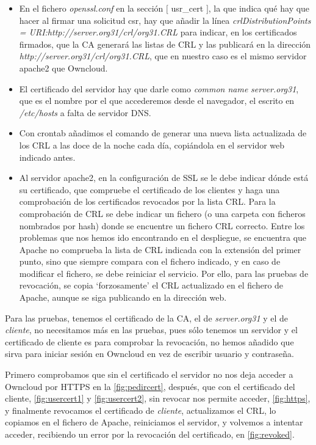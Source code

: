 \documentclass[]{article}
\begin{document}
\begin{itemize}
	\item En el fichero \textit{openssl.conf} en la sección $[$ usr\_cert $]$, la que indica qué hay que hacer al firmar una solicitud csr, hay que añadir la línea \textit{crlDistributionPoints = URI:http://server.org31/crl/org31.CRL} para indicar, en los certificados firmados, que la CA generará las listas de CRL y las publicará en la dirección \textit{http://server.org31/crl/org31.CRL}, que en nuestro caso es el mismo servidor apache2 que Owncloud.
	\item El certificado del servidor hay que darle como \textit{common name} \textit{server.org31}, que es el nombre por el que accederemos desde el navegador, el escrito en \textit{/etc/hosts} a falta de servidor DNS.
	\item Con crontab añadimos el comando de generar una nueva lista actualizada de los CRL a las doce de la noche cada día, copiándola en el servidor web indicado antes.
	\item Al servidor apache2, en la configuración de SSL se le debe indicar dónde está su certificado, que compruebe el certificado de los clientes y haga una comprobación de los certificados revocados por la lista CRL.
	\subitem Para la comprobación de CRL se debe indicar un fichero (o una carpeta con ficheros nombrados por hash) donde se encuentre un fichero CRL correcto.
	\subitem Entre los problemas que nos hemos ido encontrando en el despliegue, se encuentra que Apache no comprueba la lista de CRL indicada con la extensión del primer punto, sino que siempre compara con el fichero indicado, y en caso de modificar el fichero, se debe reiniciar el servicio. Por ello, para las pruebas de revocación, se copia `forzosamente' el CRL actualizado en el fichero de Apache, aunque se siga publicando en la dirección web.
\end{itemize}

\hfill

Para las pruebas, tenemos el certificado de la CA, el de \textit{server.org31} y el de \textit{cliente}, no necesitamos más en las pruebas, pues sólo tenemos un servidor y el certificado de cliente es para comprobar la revocación, no hemos añadido que sirva para iniciar sesión en Owncloud en vez de escribir usuario y contraseña.

Primero comprobamos que sin el certificado el servidor no nos deja acceder a Owncloud por HTTPS en la \autoref{fig:pedircert}, después, que con el certificado del cliente, \autoref{fig:usercert1} y \autoref{fig:usercert2}, sin revocar nos permite acceder,  \autoref{fig:https}, y finalmente revocamos el certificado de \textit{cliente}, actualizamos el CRL, lo copiamos en el fichero de Apache, reiniciamos el servidor, y volvemos a intentar acceder, recibiendo un error por la revocación del certificado, en \autoref{fig:revoked}.
\end{document}
